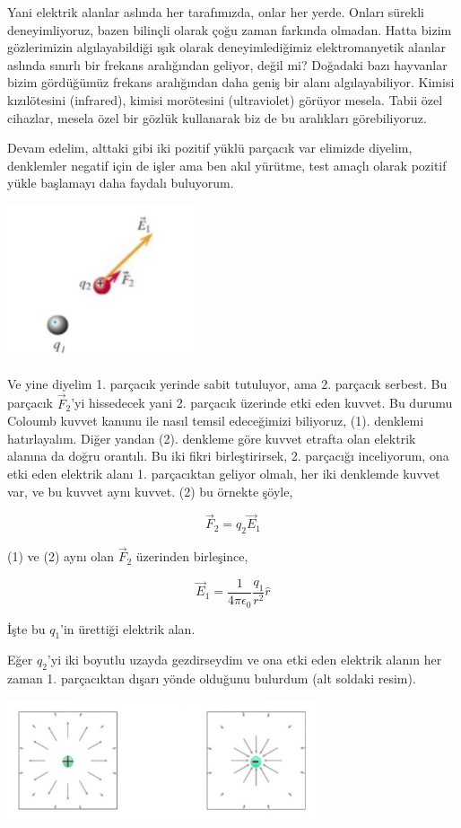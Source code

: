 \documentclass[12pt,fleqn]{article}\usepackage{../../common}
\begin{document}
Yani elektrik alanlar aslında her tarafımızda, onlar her yerde. Onları
sürekli deneyimliyoruz, bazen bilinçli olarak çoğu zaman farkında
olmadan. Hatta bizim gözlerimizin algılayabildiği ışık olarak
deneyimlediğimiz elektromanyetik alanlar aslında sınırlı bir frekans
aralığından geliyor, değil mi? Doğadaki bazı hayvanlar bizim gördüğümüz
frekans aralığından daha geniş bir alanı algılayabiliyor. Kimisi
kızılötesini (infrared), kimisi morötesini (ultraviolet) görüyor
mesela. Tabii özel cihazlar, mesela özel bir gözlük kullanarak biz de bu
aralıkları görebiliyoruz.

Devam edelim, alttaki gibi iki pozitif yüklü parçacık var elimizde diyelim,
denklemler negatif için de işler ama ben akıl yürütme, test amaçlı olarak
pozitif yükle başlamayı daha faydalı buluyorum.

\includegraphics[width=15em]{elecmag_07.png}

Ve yine diyelim 1. parçacık yerinde sabit tutuluyor, ama 2. parçacık
serbest. Bu parçacık $\vec{F}_2$'yi hissedecek yani 2. parçacık üzerinde
etki eden kuvvet. Bu durumu Coloumb kuvvet kanunu ile nasıl temsil
edeceğimizi biliyoruz, (1). denklemi hatırlayalım. Diğer yandan
(2). denkleme göre kuvvet etrafta olan elektrik alanına da doğru
orantılı. Bu iki fikri birleştirirsek, 2. parçacığı inceliyorum, ona etki
eden elektrik alanı 1. parçacıktan geliyor olmalı, her iki denklemde kuvvet
var, ve bu kuvvet aynı kuvvet. (2) bu örnekte şöyle,

$$ \vec{F}_2 = q_2 \vec{E}_1$$

(1) ve (2) aynı olan $\vec{F}_2$ üzerinden birleşince,

$$ \vec{E}_1 = \frac{1}{4\pi \epsilon_0} \frac{q_1}{r^2}\hat{r} $$

İşte bu $q_1$'in ürettiği elektrik alan. 

Eğer $q_2$'yi iki boyutlu uzayda gezdirseydim ve ona etki eden elektrik alanın
her zaman 1. parçacıktan dışarı yönde olduğunu bulurdum (alt soldaki resim).

\includegraphics[width=25em]{elecmag_06.png}
\end{document}
